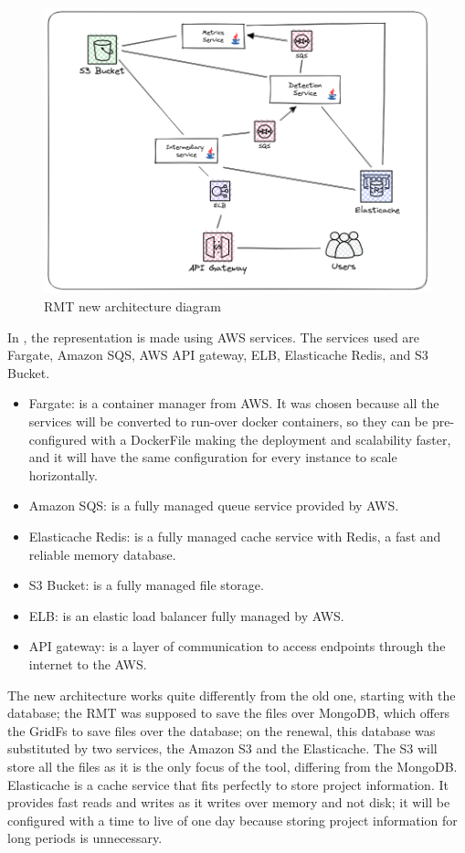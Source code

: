 \begin{figure}[ht!]
\SetCaptionWidth{\textwidth}
\caption{RMT new architecture diagram}
\label{fig-async}
\includegraphics[width =\textwidth, scale=0.2]{Chapter-4/Figures/Async.png}
\end{figure}

In , the representation is made using AWS services. The services used are Fargate, Amazon SQS, AWS API gateway, ELB, Elasticache Redis, and S3 Bucket.
\begin{itemize}
\item Fargate: is a container manager from AWS. It was chosen because all the services will be converted to run-over docker containers, so they can be pre-configured with a DockerFile making the deployment and scalability faster, and it will have the same configuration for every instance to scale horizontally.
\item Amazon SQS: is a fully managed queue service provided by AWS.
\item Elasticache Redis: is a fully managed cache service with Redis, a fast and reliable memory database.
\item S3 Bucket:  is a fully managed file storage.
\item ELB: is an elastic load balancer fully managed by AWS.
\item API gateway: is a layer of communication to access endpoints through the internet to the AWS.
\end{itemize}


The new architecture works quite differently from the old one, starting with the database; the RMT was supposed to save the files over MongoDB, which offers the GridFs to save files over the database; on the renewal, this database was substituted by two services, the Amazon S3 and the Elasticache. The S3 will store all the files as it is the only focus of the tool, differing from the MongoDB. Elasticache is a cache service that fits perfectly to store project information. It provides fast reads and writes as it writes over memory and not disk; it will be configured with a time to live of one day because storing project information for long periods is unnecessary.

